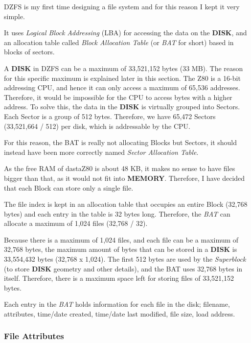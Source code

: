     DZFS is my first time designing a file system and for this reason I kept it
    very simple.

    It uses \textit{Logical Block Addressing} (LBA) for accessing the data on the
    \textbf{DISK}, and an allocation table called \textit{Block Allocation
    Table} (or \textit{BAT} for short) based in blocks of sectors.

    A \textbf{DISK} in DZFS can be a maximum of 33,521,152 bytes (33 MB). The
    reason for this specific maximum is explained later in this section. The
    Z80 is a 16-bit addressing CPU, and hence it can only access a maximum of
    65,536 addresses. Therefore, it would be impossible for the CPU to access
    bytes with a higher address. To solve this, the data in the \textbf{DISK} is
    virtually grouped into Sectors. Each Sector is a group of 512 bytes.
    Therefore, we have 65,472 Sectors (33,521,664 / 512) per disk, which is
    addressable by the CPU.

    For this reason, the BAT is really not allocating Blocks but Sectors, it
    should instead have been more correctly named \textit{Sector Allocation
    Table}.

    As the free RAM of dastaZ80 is about 48 KB, it makes no sense to have files
    bigger than that, as it would not fit into \textbf{MEMORY}. Therefore, I
    have decided that each Block can store only a single file.

    The file index is kept in an allocation table that occupies an entire Block
    (32,768 bytes) and each entry in the table is 32 bytes long. Therefore, the
    \textit{BAT} can allocate a maximum of 1,024 files (32,768 / 32).

    Because there is a maximum of 1,024 files, and each file can be a maximum
    of 32,768 bytes, the maximum amount of bytes that can be stored in a
    \textbf{DISK} is 33,554,432 bytes (32,768 x 1,024). The first 512 bytes
    are used by the \textit{Superblock} (to store \textbf{DISK} geometry and
    other details), and the BAT uses 32,768 bytes in itself. Therefore, there is
    a maximum space left for storing files of 33,521,152 bytes.

    Each entry in the \textit{BAT} holds information for each file in the disk;
    filename, attributes, time/date created, time/date last modified, file size,
    load address.

        \subsubsection{File Attributes}
        \label{subsub:fileattr}

